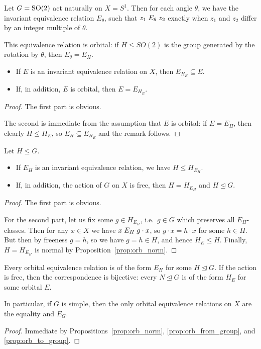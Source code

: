 	\begin{ex}
		\label{ex:single_rotation}
		Let $G=\operatorname{{SO}}(2)$ act naturally on $X=S^1$. Then for each angle $\theta$, we have the invariant equivalence relation $E_\theta$, such that $z_1\mathrel{E}_{\theta} z_2$ exactly when $z_1$ and $z_2$ differ by an integer multiple of $\theta$.
		
		This equivalence relation is orbital: if $H\leq SO(2)$ is the group generated by the rotation by $\theta$, then $E_\theta=E_H$.\xqed{\lozenge}
	\end{ex}
	\begin{prop}
		\label{prop:orb_from_group}\leavevmode
		\begin{itemize}
			\item
			If $E$ is an invariant equivalence relation on $X$, then $E_{H_E}\subseteq E$.
			\item
			If, in addition, $E$ is orbital, then $E=E_{H_E}$.
		\end{itemize}
	\end{prop}
	\begin{proof}
		The first part is obvious.
		
		The second is immediate from the assumption that $E$ is orbital: if $E=E_H$, then clearly $H\leq H_E$, so $E_H\subseteq E_{H_E}$ and the remark follows.
	\end{proof}
	
	
	\begin{prop}
		\label{prop:orb_to_group}
		Let $H\leq G$.
		\begin{itemize}
			\item
			If $E_H$ is an invariant equivalence relation, we have $H\leq H_{E_H}$.
			\item
			If, in addition, the action of $G$ on $X$ is free, then $H=H_{E_H}$ and $H\unlhd G$.
		\end{itemize}
	\end{prop}
	\begin{proof}
		The first part is obvious.
		
		For the second part, let us fix some $g\in H_{E_H}$, i.e.\ $g\in G$ which preserves all $E_H$-classes. Then for any $x\in X$ we have $x \mathrel{E}_H g\cdot x$, so $g\cdot x= h\cdot x$ for some $h\in H$. But then by freeness $g=h$, so we have $g=h\in H$, and hence $H_E\leq H$. Finally, $H=H_{E_H}$ is normal by Proposition~\ref{prop:orb_norm}.
	\end{proof}
	
	
	\begin{cor}
		\label{cor:orb_bijection}
		Every orbital equivalence relation is of the form $E_H$ for some $H\unlhd G$. If the action is free, then the correspondence is bijective: every $N\unlhd G$ is of the form $H_E$ for some orbital $E$.
		
		In particular, if $G$ is simple, then the only orbital equivalence relations on $X$ are the equality and $E_G$.
	\end{cor}
	\begin{proof}
		Immediate by Propositions~\ref{prop:orb_norm}, \ref{prop:orb_from_group}, and \ref{prop:orb_to_group}.
	\end{proof}
	
